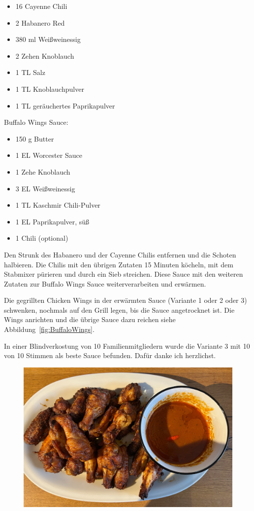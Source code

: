 \begin{itemize}[noitemsep]
	\item 16 Cayenne Chili
	\item 2 Habanero Red
	\item 380 ml Weißweinessig
	\item 2 Zehen Knoblauch
	\item 1 TL Salz
	\item 1 TL Knoblauchpulver
	\item 1 TL geräuchertes Paprikapulver
\end{itemize}

Buffalo Wings Sauce:

\begin{itemize}[noitemsep]
	\item 150 g Butter
	\item 1 EL Worcester Sauce
	\item 1 Zehe Knoblauch 
	\item 3 EL Weißweinessig
	\item 1 TL Kaschmir Chili-Pulver
	\item 1 EL Paprikapulver, süß
	\item 1 Chili (optional)
\end{itemize}

Den Strunk des Habanero und der Cayenne Chilis entfernen und die Schoten 
halbieren. Die Chilis mit den übrigen Zutaten 15 Minuten 
köcheln, mit dem Stabmixer pürieren und durch ein Sieb streichen. Diese Sauce 
mit den weiteren Zutaten zur Buffalo Wings Sauce 
weiterverarbeiten und erwärmen.

Die gegrillten Chicken Wings in der erwärmten Sauce (Variante 1 oder 2 oder 3) 
schwenken, nochmals auf den Grill legen, bis 
die Sauce angetrocknet ist. Die Wings anrichten und die übrige Sauce dazu 
reichen siehe Abbildung~\vref{fig:BuffaloWings}.

In einer Blindverkostung von 10 Familienmitgliedern wurde die Variante 3 mit 10 
von 10 Stimmen als beste Sauce befunden. Dafür danke ich 
herzlichst.                    
\newpage

\begin{figure}[htbp]
	\centering
	\begin{minipage}{1\textwidth}
		\centering
		\includegraphics[width=.9\linewidth]{pics/Buffalo_Wings}
		\label{fig:BuffaloWings}
	\end{minipage}
\end{figure}
\newpage

